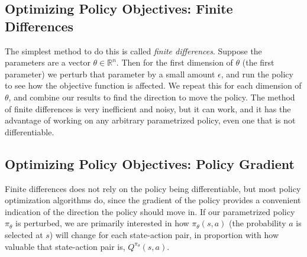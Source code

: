 \documentclass{article}
\newcommand{\ita}{\textit}
\newcommand{\eps}{\epsilon}
\newcommand{\R}{\mathbb{R}}
\begin{document}
\subsection{Optimizing Policy Objectives: Finite Differences}

The simplest method to do this is called \ita{finite differences}. Suppose the parameters are a vector $\theta\in\R^n$. Then for the first dimension of $\theta$ (the first parameter) we perturb that parameter by a small amount $\eps$, and run the policy to see how the objective function is affected. We repeat this for each dimension of $\theta$, and combine our results to find the direction to move the policy. The method of finite differences is very inefficient and noisy, but it can work, and it has the advantage of working on any arbitrary parametrized policy, even one that is not differentiable.

\subsection{Optimizing Policy Objectives: Policy Gradient}

Finite differences does not rely on the policy being differentiable, but most policy optimization algorithms do, since the gradient of the policy provides a convenient indication of the direction the policy should move in. If our parametrized policy $\pi_\theta$ is perturbed, we are primarily interested in how $\pi_\theta(s, a)$ (the probability $a$ is selected at $s$) will change for each state-action pair, in proportion with how valuable that state-action pair is, $Q^{\pi_\theta}(s, a)$.
\end{document}
